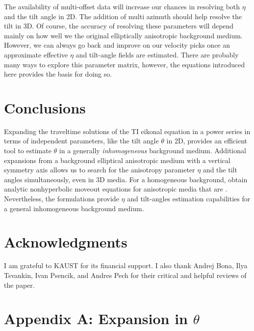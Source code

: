 The availability of multi-offset data will increase our chances in resolving both $\eta$ and the tilt angle in 2D. The addition
of multi azimuth should help resolve the tilt in 3D.
Of course, the accuracy of resolving these parameters will depend 
mainly on how well we   the original elliptically anisotropic background medium. However, we can always go back
and improve on our velocity picks once an approximate effective $\eta$ and tilt-angle fields are estimated. There are probably
many   ways to explore this parameter matrix, however, the equations introduced here provides the basis for doing
so.

\section{Conclusions}

Expanding the traveltime solutions of the TI eikonal equation in a power series in terms of independent
 parameters, like the tilt angle $\theta$ in 2D, provides an efficient tool to estimate $\theta$ in a generally {\emph{inhomogeneous}} background 
medium. Additional expansions from a background elliptical anisotropic medium with a vertical symmetry axis allows us
to search for the anisotropy parameter $\eta$ and the tilt angles simultaneously, even in 3D media. 
For a homogeneous background,   obtain analytic nonhyperbolic moveout equations
for anisotropic media that are  . Nevertheless, the formulations
provide $\eta$ and tilt-angles estimation capabilities  for a general inhomogeneous background medium. 

\section{Acknowledgments}

I am grateful to KAUST for its financial support. I also thank Andrej Bona, Ilya Tsvankin, Ivan
Psencik, and Andres Pech for their critical and helpful reviews of the paper.


%


\appendix
\section{Appendix A: Expansion in $\theta$}

